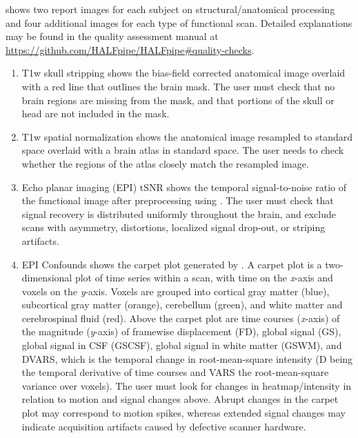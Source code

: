  shows two report images for each subject on
structural/anatomical processing and four additional images for each type
of functional scan. Detailed explanations may be found in the quality
assessment manual at
\url{https://github.com/HALFpipe/HALFpipe\#quality-checks}.

\begin{enumerate}[leftmargin=*]

\item

T1w skull stripping shows the bias-field corrected anatomical image
overlaid with a red line that outlines the brain mask. The user must check
that no brain regions are missing from the mask, and that portions of the
skull or head are not included in the mask.

\item

T1w spatial normalization shows the anatomical image resampled to standard
space overlaid with a brain atlas in standard space. The user needs to
check whether the regions of the atlas closely match the resampled image.

\item

Echo planar imaging (EPI) tSNR shows the temporal signal-to-noise ratio of
the functional image after preprocessing using . The user
must check that signal recovery is distributed uniformly throughout the
brain, and exclude scans with asymmetry, distortions, localized signal
drop-out, or striping artifacts.

\item

EPI Confounds shows the carpet plot
\parencite{10.1016/j.neuroimage.2016.08.009,10.1016/j.neuroimage.2020.116614}
generated by . A carpet plot is a two-dimensional plot of
time series within a scan, with time on the \emph{x}-axis and voxels on the
\emph{y}-axis. Voxels are grouped into cortical gray matter (blue),
subcortical gray matter (orange), cerebellum (green), and white matter and
cerebrospinal fluid (red). Above the carpet plot are time courses (\emph{x}-axis)
of the magnitude (\emph{y}-axis) of framewise displacement (FD), global signal
(GS), global signal in CSF (GSCSF), global signal in white matter (GSWM),
and DVARS, which is the temporal change in root-mean-square intensity (D being the
temporal derivative of time courses and VARS the root-mean-square variance
over voxels). The user must look for changes in heatmap/intensity in
relation to motion and signal changes above. Abrupt changes in the carpet
plot may correspond to motion spikes, whereas extended signal changes may
indicate acquisition artifacts caused by defective scanner hardware.


\end{enumerate}
